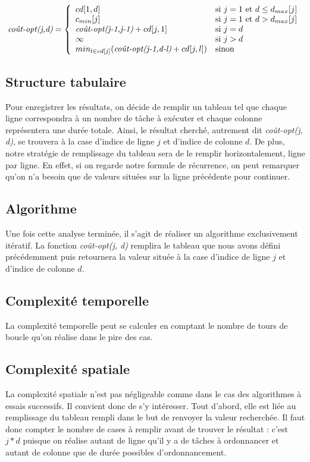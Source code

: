 \documentclass[a4paper, titlepage]{article}
\begin{document}
		$$
		\mbox{\emph{coût-opt(j,d)}} = \left\{
		    \begin{array}{ll}
		        cd[1,d] & \mbox{si } j=1 \mbox{ et } d \le d_{max}[j] \\
		        c_{min}[j] & \mbox{si } j=1 \mbox{ et } d > d_{max}[j] \\
		        \mbox{\emph{coût-opt(j-1,j-1)}} + cd[j,1] & \mbox{si } j=d \\
		        \infty & \mbox{si } j>d \\
		        min_{l \in cd[j]}(\mbox{\emph{coût-opt(j-1,d-l)}} + cd[j,l]) & \mbox{sinon} \\
		    \end{array}
		\right.
		$$
		
	\subsection{Structure tabulaire}
		Pour enregistrer les résultats, on décide de remplir un tableau tel que chaque ligne correspondra à un nombre de tâche à exécuter et chaque colonne représentera une durée totale.
		Ainsi, le résultat cherché, autrement dit \emph{coût-opt(j, d)}, se trouvera à la case d'indice de ligne $j$ et d'indice de colonne $d$.
		De plus, notre stratégie de remplissage du tableau sera de le remplir horizontalement, ligne par ligne.
		En effet, si on regarde notre formule de récurrence, on peut remarquer qu'on n'a besoin que de valeurs situées sur la ligne précédente pour continuer.
	
	\subsection{Algorithme}
		Une fois cette analyse terminée, il s'agit de réaliser un algorithme exclusivement itératif.
		La fonction \emph{coût-opt(j, d)} remplira le tableau que nous avons défini précédemment puis retournera la valeur située à la case d'indice de ligne $j$ et d'indice de colonne $d$.
		
	\subsection{Complexité temporelle}
		La complexité temporelle peut se calculer en comptant le nombre de tours de boucle qu'on réalise dans le pire des cas.
		
	\subsection{Complexité spatiale}
		La complexité spatiale n'est pas négligeable comme dans le cas des algorithmes à essais successifs.
		Il convient donc de s'y intéresser.
		Tout d'abord, elle est liée au remplissage du tableau rempli dans le but de renvoyer la valeur recherchée.
		Il faut donc compter le nombre de cases à remplir avant de trouver le résultat : c'est $j*d$ puisque on réalise autant de ligne qu'il y a de tâches à ordonnancer et autant de colonne que de durée possibles d'ordonnancement.
	
\end{document}

